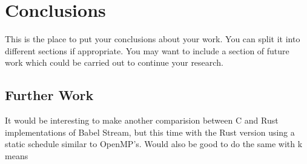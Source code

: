 \chapter{Conclusions}

This is the place to put your conclusions about your work. You can
split it into different sections if appropriate. You may want to include
a section of future work which could be carried out to continue your
research.

\section{Further Work}
It would be interesting to make another comparision between C and Rust implementations of Babel Stream, but this time with the Rust version using a static schedule similar to OpenMP's. Would also be good to do the same with k means
